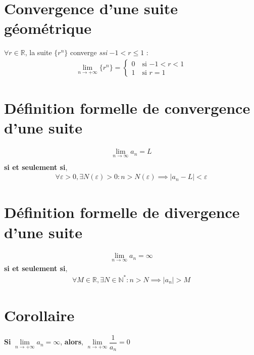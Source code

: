 \documentclass{report}
\begin{document}
\begin{multicols*}{3}
        \section{Convergence d'une suite géométrique}
        $\forall r \in \mathbb{R}$, la suite $\{r^n\}$ converge        
        \textit{ssi} $-1 < r \leq 1$ : 
        \begin{align*}
            \lim\limits_{n\to+\infty }\{r^n\} = 
                    \begin{cases}
                        0 \quad \text{si $-1 < r < 1$} \\
                        1 \quad \text{si $r = 1$}
                    \end{cases}
        \end{align*}


        

    \section{Définition formelle de convergence d'une suite}
      \begin{align*}
        \lim\limits_{n \to\infty  }{a_n} = L \\
      \end{align*}
      \textbf{si et seulement si}, 
      \begin{align*}
        \forall\varepsilon > 0, \exists N\left( \varepsilon \right) > 0 : 
        n > N\left( \varepsilon \right) \implies 
        |a_n -L| < \varepsilon
      \end{align*}



    \section{Définition formelle de divergence d'une suite}
      \begin{align*}
        \lim\limits_{n  \to\infty  }{a_n} = \infty
      \end{align*}
      \textbf{si et seulement si},  
        \begin{align*}
            \forall M \in \mathbb{R}, \exists N \in \mathbb{N}^{*} :
            n > N \implies |a_n| > M 
        \end{align*}

    \section{Corollaire}
    \textbf{Si} $\lim\limits_{n\to+\infty }a_n  = \infty$,  
    \textbf{alors}, 
    $\lim\limits_{n\to+\infty }{\dfrac{1}{a_n}}  = 0$





\end{multicols*}
\end{document}

